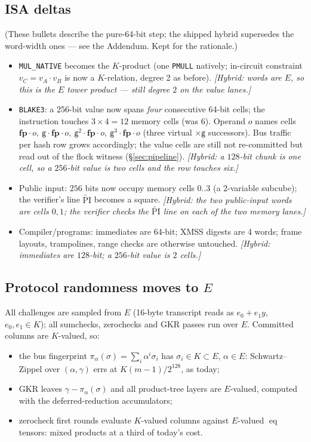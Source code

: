 \documentclass[11pt]{article}
\newcommand{\K}{K}            %
\newcommand{\E}{E}            %
\newcommand{\eq}{\operatorname{eq}}
\newcommand{\gen}{\mathsf{g}}
\begin{document}
\subsection{ISA deltas}

(These bullets describe the pure-64-bit step; the shipped hybrid supersedes the
word-width ones — see the Addendum. Kept for the rationale.)
\begin{itemize}
\item \texttt{MUL\_NATIVE} becomes the $\K$-product (one \texttt{PMULL}
  natively; in-circuit constraint $v_C=v_A\cdot v_B$ is now a $\K$-relation,
  degree 2 as before). \emph{[Hybrid: words are $\E$, so this is the $\E$ tower
  product — still degree $2$ on the value lanes.]}
\item \texttt{BLAKE3}: a 256-bit value now spans \emph{four} consecutive
  64-bit cells; the instruction touches $3\times4=12$ memory cells (was 6).
  Operand $o$ names cells $\mathbf{fp}\cdot o,\ \gen\cdot\mathbf{fp}\cdot o,\
  \gen^2\cdot\mathbf{fp}\cdot o,\ \gen^3\cdot\mathbf{fp}\cdot o$ (three
  virtual $\times\gen$ successors). Bus traffic per hash row grows
  accordingly; the value cells are still not re-committed but read out of the
  flock witness (\S\ref{sec:pipeline}). \emph{[Hybrid: a $128$-bit chunk is one
  cell, so a $256$-bit value is \emph{two} cells and the row touches six.]}
\item Public input: $256$ bits now occupy memory cells $0..3$ (a 2-variable
  subcube); the verifier's line $\widetilde{\mathrm{PI}}$ becomes a
  square. \emph{[Hybrid: the two public-input words are cells $0,1$; the
  verifier checks the $\widetilde{\mathrm{PI}}$ line on each of the two memory
  lanes.]}
\item Compiler/programs: immediates are 64-bit; XMSS digests are 4 words;
  frame layouts, trampolines, range checks are otherwise untouched.
  \emph{[Hybrid: immediates are $128$-bit; a $256$-bit value is $2$ cells.]}
\end{itemize}

\subsection{Protocol randomness moves to $\E$}

All challenges are sampled from $\E$ (16-byte transcript reads as $e_0+e_1y$,
$e_0,e_1\in\K$); all sumchecks, zerochecks and GKR passes run
over $\E$. Committed columns are $\K$-valued, so:
\begin{itemize}
\item the bus fingerprint $\pi_\alpha(\sigma)=\sum_i\alpha^i\sigma_i$ has
  $\sigma_i\in\K\subset\E$, $\alpha\in\E$: Schwartz--Zippel over
  $(\alpha,\gamma)$ errs at $K(m-1)/2^{128}$, as today;
\item GKR leaves $\gamma-\pi_\alpha(\sigma)$ and all product-tree layers
  are $\E$-valued, computed with the deferred-reduction accumulators;
\item zerocheck first rounds evaluate $\K$-valued columns against $\E$-valued
  $\eq$ tensors: mixed products at a third of today's cost.
\end{itemize}
\end{document}
